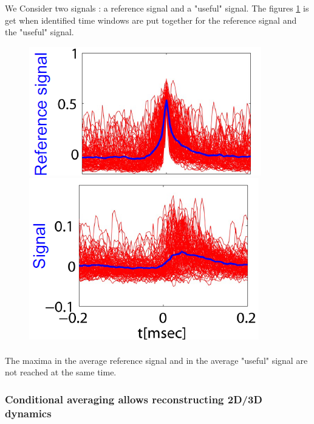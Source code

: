 We Consider two signals : a reference signal and a "useful" signal. The figures \ref{fig:conditionnal averaging} is get when identified time windows are put together for the reference signal and the "useful" signal. 

\begin{figure}[h]
    \begin{minipage}{0.5\textwidth}
        \centering
        \includegraphics[scale=0.8]{Figures Cours Traitement du Signal/Reference signal 1.png}
    \end{minipage}
    \begin{minipage}{0.5\textwidth}
        \centering
        \includegraphics[scale=0.8]{Figures Cours Traitement du Signal/Useful Signal - 2.png}
    \end{minipage}
    \caption{}
    \label{fig:conditionnal averaging}
\end{figure}

\paragraph{}
The maxima in the average reference signal and in the average "useful" signal are not reached at the same time. 

\newpage
\subsubsection{Conditional averaging allows reconstructing 2D/3D
dynamics}

